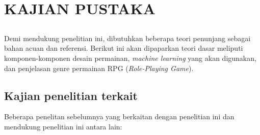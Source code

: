 \chapter{KAJIAN PUSTAKA}
\label{chap:chap2_kajian_pustaka}

\section*{}
Demi mendukung penelitian ini, dibutuhkan beberapa teori penunjang sebagai bahan acuan dan referensi. Berikut ini akan dipaparkan teori dasar meliputi komponen-komponen desain permainan, \textit{machine learning} yang akan digunakan, dan penjelasan genre permainan RPG (\textit{Role-Playing Game}).
\vspace{1ex}

\section{Kajian penelitian terkait}
\label{sec:sec2_kajian}
\vspace{1ex}

Beberapa penelitan sebelumnya yang berkaitan dengan penelitian ini dan mendukung penelitian ini antara lain:

